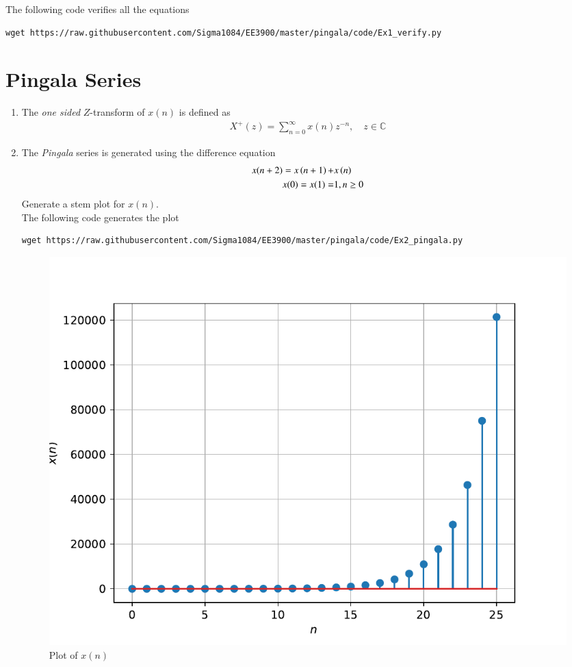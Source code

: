 \documentclass[journal,12pt,twocolumn]{IEEEtran}
\renewcommand\thesection{\arabic{section}}
\begin{document}
\solution
	The following code verifies all the equations
	\begin{lstlisting}
wget https://raw.githubusercontent.com/Sigma1084/EE3900/master/pingala/code/Ex1_verify.py
	\end{lstlisting}



\section{Pingala Series}

\begin{enumerate}[label=\thesection.\arabic*,ref=\thesection.\theenumi]

\item The {\em one sided} $Z$-transform of $x(n)$ is defined as 
	\begin{align}
		X^{+}(z) = \sum_{n = 0}^{\infty}x(n)z^{-n}, \quad z \in \mathbb{C}
		\label{eq:one-Z}
	\end{align}

\item The {\em Pingala} series is generated using the difference equation 
	\begin{align}
		\begin{split} \label{eq:10-pingala}
			x(n+2) = x\left(n+1\right) +& x\left(n\right) \\
			x(0) = x(1) =& 1, n \ge 0
		\end{split}
	\end{align}
	Generate a stem plot for $x(n)$. \\
	\solution The following code generates the plot
	\begin{lstlisting}
wget https://raw.githubusercontent.com/Sigma1084/EE3900/master/pingala/code/Ex2_pingala.py
	\end{lstlisting}
	\begin{figure}[!htp]
		\includegraphics[width=\columnwidth]{../figs/x_n.pdf}
		\caption{Plot of $x(n)$}
		\label{fig:x-n}
	\end{figure}



\end{enumerate}
\end{document}
